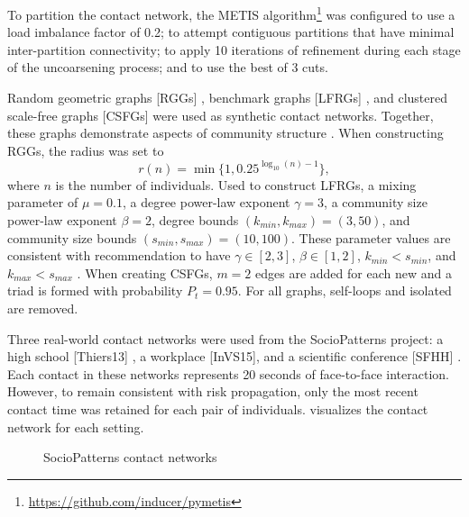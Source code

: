 To partition the contact network, the METIS algorithm\footnote{\url{https://github.com/inducer/pymetis}} \citep{Karypis1998} was configured to use a load imbalance factor of \num{0.2}; to attempt contiguous partitions that have minimal inter-partition connectivity; to apply 10 iterations of refinement during each stage of the uncoarsening process; and to use the best of \num{3} cuts.

Random geometric graphs [RGGs] \citep{Dall2002}, benchmark graphs [LFRGs] \citep{Lancichinetti2008}, and clustered scale-free graphs [CSFGs] \citep{Holme2002} were used as synthetic contact networks. Together, these graphs demonstrate aspects of community structure \citep{Fortunato2010}. When constructing RGGs, the radius was set to
\begin{equation*}
  r(n) = \min \{1, 0.25^{\log_{10}(n) - 1}\},
\end{equation*}
where $n$ is the number of individuals. Used to construct LFRGs, a mixing parameter of $\mu = 0.1$, a degree power-law exponent $\gamma = 3$, a community size power-law exponent $\beta = 2$, degree bounds $(k_\mathit{min}, k_\mathit{max}) = (3, 50)$, and community size bounds $(s_\mathit{min}, s_\mathit{max}) = (10, 100)$. These parameter values are consistent with recommendation to have $\gamma \in [2, 3]$,  $\beta \in [1, 2]$, $k_\mathit{min} < s_\mathit{min}$, and $k_\mathit{max} < s_\mathit{max}$ \citep{Lancichinetti2008}. When creating CSFGs, $m = 2$ edges are added for each new \vertexName{} and a triad is formed with probability $P_t = 0.95$. For all graphs, self-loops and isolated \verticesName{} are removed.

Three real-world contact networks were used from the SocioPatterns project: a high school [Thiers13] \citep{Fournet2014}, a workplace [InVS15], and a scientific conference [SFHH] \citep{G_enois2018}. Each contact in these networks represents \num{20} seconds of face-to-face interaction. However, to remain consistent with risk propagation, only the most recent contact time was retained for each pair of individuals. visualizes the contact network for each setting.

\begin{figure}[htbp]
\centering
{}
\caption{SocioPatterns contact networks}
\label{fig:real-networks}
\end{figure}

